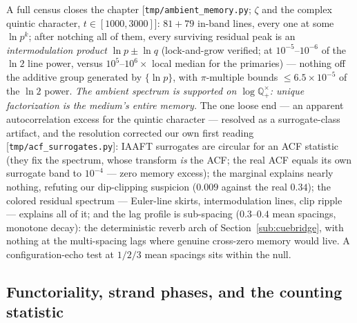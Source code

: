 \documentclass[11pt]{article}
\newcommand{\code}[1]{\texttt{#1}}
\begin{document}
A full census closes the chapter [\code{tmp/ambient\_memory.py}; $\zeta$ and the complex quintic
character, $t\in[1000,3000]$]: $81+79$ in-band lines, every one at some $\ln p^{k}$; after notching
all of them, every surviving residual peak is an \emph{intermodulation product} $\ln p\pm\ln q$
(lock-and-grow verified; at $10^{-5}$--$10^{-6}$ of the $\ln2$ line power, versus
$10^{5}$--$10^{6}\times$ local median for the primaries) --- nothing off the additive group
generated by $\{\ln p\}$, with $\pi$-multiple bounds $\le6.5\times10^{-5}$ of the $\ln2$ power.
\emph{The ambient spectrum is supported on $\log\mathbb{Q}_{+}^{\times}$: unique factorization is
the medium's entire memory.}  The one loose end --- an apparent autocorrelation excess for the
quintic character --- resolved as a surrogate-class artifact, and the resolution corrected our own
first reading [\code{tmp/acf\_surrogates.py}]: IAAFT surrogates are circular for an ACF statistic
(they fix the spectrum, whose transform \emph{is} the ACF; the real ACF equals its own surrogate
band to $10^{-4}$ --- zero memory excess); the marginal explains nearly nothing, refuting our
dip-clipping suspicion ($0.009$ against the real $0.34$); the colored residual spectrum ---
Euler-line skirts, intermodulation lines, clip ripple --- explains all of it; and the lag profile
is sub-spacing ($0.3$--$0.4$ mean spacings, monotone decay): the deterministic reverb arch of
Section~\ref{sub:cuebridge}, with nothing at the multi-spacing lags where genuine cross-zero
memory would live.  A configuration-echo test at $1/2/3$ mean spacings sits within the null.

\subsection{Functoriality, strand phases, and the counting statistic}\label{sub:functoriality}
\end{document}
